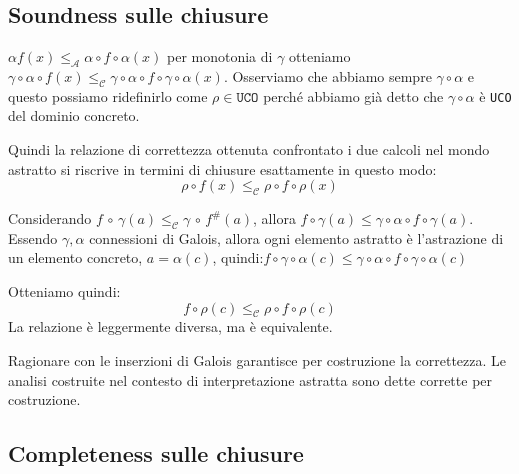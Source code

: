 \subsection{Soundness sulle chiusure}
$\alpha f(x) \leq_\mathcal{A} \alpha \circ f \circ \alpha(x)$ per monotonia di $\gamma$ 
otteniamo $\gamma \circ \alpha \circ f(x) \leq_\mathcal{C} \gamma \circ \alpha
\circ f \circ \gamma \circ \alpha(x)$. Osserviamo che abbiamo sempre $\gamma \circ \alpha$
e questo possiamo ridefinirlo come $\rho \in \texttt{UCO}$ perché abbiamo già detto che  
$\gamma \circ \alpha$ è \texttt{UCO} del dominio concreto. 

Quindi la relazione di correttezza ottenuta confrontato i due calcoli nel mondo 
astratto si riscrive in termini di chiusure esattamente in questo modo:
\[
    \rho \circ f(x) \leq_\mathcal{C} \rho \circ f \circ \rho(x)
\]

Considerando $f \, \circ \, \gamma(a) \leq_\mathcal{C} \gamma \, \circ \, f^\#(a)$, allora
$f \circ \gamma(a) \leq \gamma \circ \alpha \circ f \circ \gamma(a)$. Essendo $\gamma, \alpha$ 
connessioni di Galois, allora ogni elemento astratto è l'astrazione di un elemento concreto, 
$a = \alpha(c)$, quindi:$f \circ \gamma \circ \alpha(c) \leq \gamma
\circ \alpha \circ f \circ \gamma \circ \alpha(c)$

Otteniamo quindi:
\[
  f \circ \rho(c) \leq_\mathcal{C} \rho \circ f \circ \rho(c)
\]
La relazione è leggermente diversa, ma è equivalente. 

\begin{tcolorbox}
    Ragionare con le inserzioni di Galois garantisce per costruzione la correttezza.
    Le analisi costruite nel contesto di interpretazione astratta sono dette 
    corrette per costruzione.
\end{tcolorbox}
\subsection{Completeness sulle chiusure}

